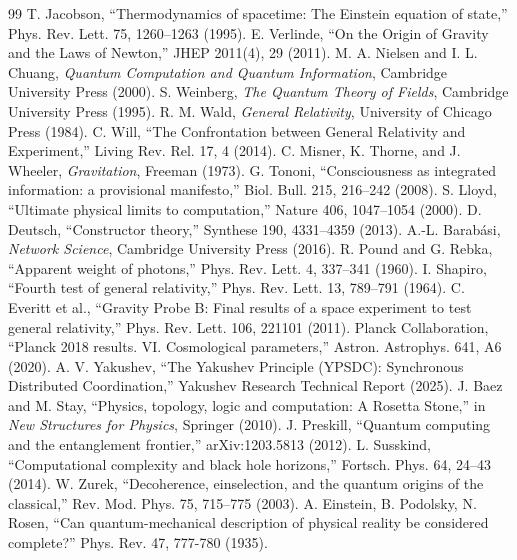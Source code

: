 \documentclass[11pt,a4paper]{article}
\begin{document}
	\begin{thebibliography}{99}
		 T. Jacobson, ``Thermodynamics of spacetime: The Einstein equation of state,'' Phys. Rev. Lett. 75, 1260–1263 (1995).
		 E. Verlinde, ``On the Origin of Gravity and the Laws of Newton,'' JHEP 2011(4), 29 (2011).
		 M. A. Nielsen and I. L. Chuang, \emph{Quantum Computation and Quantum Information}, Cambridge University Press (2000).
		 S. Weinberg, \emph{The Quantum Theory of Fields}, Cambridge University Press (1995).
		 R. M. Wald, \emph{General Relativity}, University of Chicago Press (1984).
		 C. Will, ``The Confrontation between General Relativity and Experiment,'' Living Rev. Rel. 17, 4 (2014).
		 C. Misner, K. Thorne, and J. Wheeler, \emph{Gravitation}, Freeman (1973).
		 G. Tononi, ``Consciousness as integrated information: a provisional manifesto,'' Biol. Bull. 215, 216–242 (2008).
		 S. Lloyd, ``Ultimate physical limits to computation,'' Nature 406, 1047–1054 (2000).
		 D. Deutsch, ``Constructor theory,'' Synthese 190, 4331–4359 (2013).
		 A.-L. Barabási, \emph{Network Science}, Cambridge University Press (2016).
		 R. Pound and G. Rebka, ``Apparent weight of photons,'' Phys. Rev. Lett. 4, 337–341 (1960).
		 I. Shapiro, ``Fourth test of general relativity,'' Phys. Rev. Lett. 13, 789–791 (1964).
		 C. Everitt et al., ``Gravity Probe B: Final results of a space experiment to test general relativity,'' Phys. Rev. Lett. 106, 221101 (2011).
		 Planck Collaboration, ``Planck 2018 results. VI. Cosmological parameters,'' Astron. Astrophys. 641, A6 (2020).
		 A. V. Yakushev, ``The Yakushev Principle (YPSDC): Synchronous Distributed Coordination,'' Yakushev Research Technical Report (2025).
		 J. Baez and M. Stay, ``Physics, topology, logic and computation: A Rosetta Stone,'' in \emph{New Structures for Physics}, Springer (2010).
		 J. Preskill, ``Quantum computing and the entanglement frontier,'' arXiv:1203.5813 (2012).
		 L. Susskind, ``Computational complexity and black hole horizons,'' Fortsch. Phys. 64, 24–43 (2014).
		 W. Zurek, ``Decoherence, einselection, and the quantum origins of the classical,'' Rev. Mod. Phys. 75, 715–775 (2003).
		 A. Einstein, B. Podolsky, N. Rosen, ``Can quantum-mechanical description of physical reality be considered complete?'' Phys. Rev. 47, 777-780 (1935).

\end{thebibliography}
\end{document}
